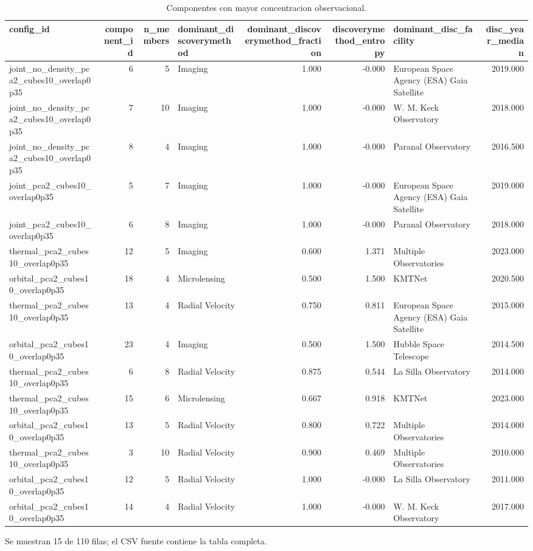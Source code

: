 \begin{table}[H]
\centering
\scriptsize
\caption{Componentes con mayor concentracion observacional.}
\label{tab:component_discovery_bias}
\begin{adjustbox}{max width=\linewidth}
\begin{tabular}{lrrlrrlr}
\toprule
config\_id & component\_id & n\_members & dominant\_discoverymethod & dominant\_discoverymethod\_fraction & discoverymethod\_entropy & dominant\_disc\_facility & disc\_year\_median \\
\midrule
joint\_no\_density\_pca2\_cubes10\_overlap0p35 & 6 & 5 & Imaging & 1.000 & -0.000 & European Space Agency (ESA) Gaia Satellite & 2019.000 \\
joint\_no\_density\_pca2\_cubes10\_overlap0p35 & 7 & 10 & Imaging & 1.000 & -0.000 & W. M. Keck Observatory & 2018.000 \\
joint\_no\_density\_pca2\_cubes10\_overlap0p35 & 8 & 4 & Imaging & 1.000 & -0.000 & Paranal Observatory & 2016.500 \\
joint\_pca2\_cubes10\_overlap0p35 & 5 & 7 & Imaging & 1.000 & -0.000 & European Space Agency (ESA) Gaia Satellite & 2019.000 \\
joint\_pca2\_cubes10\_overlap0p35 & 6 & 8 & Imaging & 1.000 & -0.000 & Paranal Observatory & 2018.000 \\
thermal\_pca2\_cubes10\_overlap0p35 & 12 & 5 & Imaging & 0.600 & 1.371 & Multiple Observatories & 2023.000 \\
orbital\_pca2\_cubes10\_overlap0p35 & 18 & 4 & Microlensing & 0.500 & 1.500 & KMTNet & 2020.500 \\
thermal\_pca2\_cubes10\_overlap0p35 & 13 & 4 & Radial Velocity & 0.750 & 0.811 & European Space Agency (ESA) Gaia Satellite & 2015.000 \\
orbital\_pca2\_cubes10\_overlap0p35 & 23 & 4 & Imaging & 0.500 & 1.500 & Hubble Space Telescope & 2014.500 \\
thermal\_pca2\_cubes10\_overlap0p35 & 6 & 8 & Radial Velocity & 0.875 & 0.544 & La Silla Observatory & 2014.000 \\
thermal\_pca2\_cubes10\_overlap0p35 & 15 & 6 & Microlensing & 0.667 & 0.918 & KMTNet & 2023.000 \\
orbital\_pca2\_cubes10\_overlap0p35 & 13 & 5 & Radial Velocity & 0.800 & 0.722 & Multiple Observatories & 2014.000 \\
thermal\_pca2\_cubes10\_overlap0p35 & 3 & 10 & Radial Velocity & 0.900 & 0.469 & Multiple Observatories & 2010.000 \\
orbital\_pca2\_cubes10\_overlap0p35 & 12 & 5 & Radial Velocity & 1.000 & -0.000 & La Silla Observatory & 2011.000 \\
orbital\_pca2\_cubes10\_overlap0p35 & 14 & 4 & Radial Velocity & 1.000 & -0.000 & W. M. Keck Observatory & 2017.000 \\
\bottomrule
\end{tabular}
\end{adjustbox}
\vspace{0.4em}\begin{minipage}{0.96\linewidth}\footnotesize Se muestran 15 de 110 filas; el CSV fuente contiene la tabla completa.\end{minipage}
\end{table}
